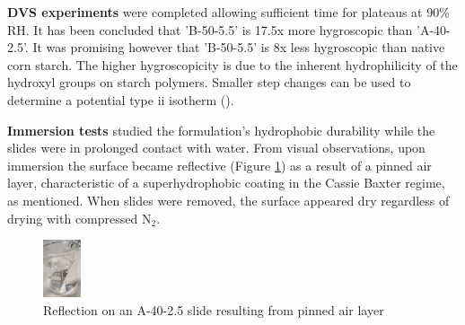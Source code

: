 \textbf{DVS experiments} were completed allowing sufficient time for plateaus at 90\% RH. It has been concluded that 'B-50-5.5' is 17.5x more hygroscopic than 'A-40-2.5'. It was promising however that 'B-50-5.5' is 8x less hygroscopic than native corn starch. The higher hygroscopicity is due to the inherent hydrophilicity of the hydroxyl groups on starch polymers. Smaller step changes can be used to determine a potential type ii isotherm (\cite{starch_dvs}). 
\par \textbf{Immersion tests} studied the formulation’s hydrophobic durability while the slides were in prolonged contact with water. From visual observations, upon immersion the surface became reflective (Figure \ref{silver}) as a result of a pinned air layer, characteristic of a superhydrophobic coating in the Cassie Baxter regime, as mentioned.  When slides were removed, the surface appeared dry regardless of drying with compressed N$_2$. 

\begin{figure}
\centering
    \includegraphics[width=0.1\textwidth]{Sections/Figures/silver.png}
  \caption{Reflection on an A-40-2.5 slide resulting from pinned air layer}
  \label{silver}
\end{figure}







